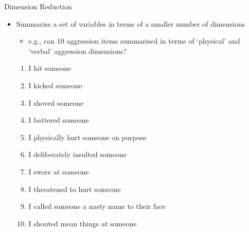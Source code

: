 \documentclass[
  ignorenonframetext,
]{beamer}
\providecommand{\tightlist}{%
  \setlength{\itemsep}{0pt}\setlength{\parskip}{0pt}}
\begin{document}
\begin{frame}{Dimension Reduction}
\protect\hypertarget{dimension-reduction}{}

\begin{itemize}
\tightlist
\item
  Summarise a set of variables in terms of a smaller number of
  dimensions

  \begin{itemize}
  \tightlist
  \item
    e.g., can 10 aggression items summarised in terms of `physical' and
    `verbal' aggression dimensions?
  \end{itemize}

  \begin{enumerate}
  \tightlist
  \item
    I hit someone
  \item
    I kicked someone
  \item
    I shoved someone
  \item
    I battered someone
  \item
    I physically hurt someone on purpose
  \item
    I deliberately insulted someone
  \item
    I swore at someone
  \item
    I threatened to hurt someone
  \item
    I called someone a nasty name to their face
  \item
    I shouted mean things at someone
  \end{enumerate}
\end{itemize}

\end{frame}
\end{document}
